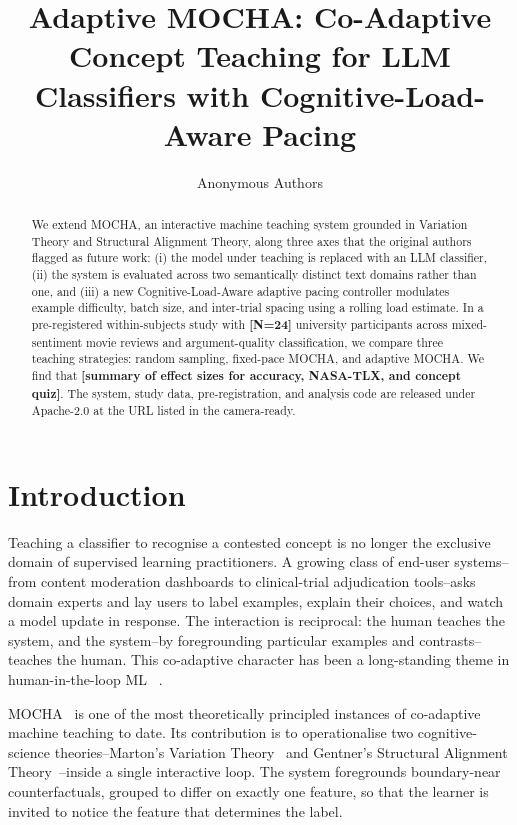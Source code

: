 \documentclass[sigchi, anonymous=true, review=true]{acmart}
\title{Adaptive MOCHA: Co-Adaptive Concept Teaching for LLM Classifiers with Cognitive-Load-Aware Pacing}
\author{Anonymous Authors}
\affiliation{\institution{Anonymous Institution}\country{Anonymous Country}}
\newcommand{\chiplaceholder}[1]{{\color{red}\textbf{[#1]}}}
\begin{document}
\begin{abstract}
We extend MOCHA, an interactive machine teaching system grounded in Variation
Theory and Structural Alignment Theory, along three axes that the original
authors flagged as future work: (i) the model under teaching is replaced with
an LLM classifier, (ii) the system is evaluated across two semantically
distinct text domains rather than one, and (iii) a new Cognitive-Load-Aware
adaptive pacing controller modulates example difficulty, batch size, and
inter-trial spacing using a rolling load estimate. In a pre-registered
within-subjects study with \chiplaceholder{N=24} university participants
across mixed-sentiment movie reviews and argument-quality classification, we
compare three teaching strategies: random sampling, fixed-pace MOCHA, and
adaptive MOCHA. We find that
\chiplaceholder{summary of effect sizes for accuracy, NASA-TLX, and concept
quiz}. The system, study data, pre-registration, and analysis code are
released under Apache-2.0 at the URL listed in the camera-ready.
\end{abstract}

\maketitle

\section{Introduction}

Teaching a classifier to recognise a contested concept is no longer the
exclusive domain of supervised learning practitioners. A growing class of
end-user systems--from content moderation dashboards to clinical-trial
adjudication tools--asks domain experts and lay users to label examples,
explain their choices, and watch a model update in response. The interaction
is reciprocal: the human teaches the system, and the system--by foregrounding
particular examples and contrasts--teaches the human. This co-adaptive
character has been a long-standing theme in human-in-the-loop ML
~\cite{amershi2014power,fails2003interactive}.

MOCHA~\cite{gebreegziabher2024mocha} is one of the most theoretically
principled instances of co-adaptive machine teaching to date. Its contribution
is to operationalise two cognitive-science theories--Marton's Variation
Theory~\cite{marton1981phenomenography} and Gentner's Structural Alignment
Theory~\cite{gentner1983structure}--inside a single interactive loop. The
system foregrounds boundary-near counterfactuals, grouped to differ on
exactly one feature, so that the learner is invited to notice the feature
that determines the label.
\end{document}
